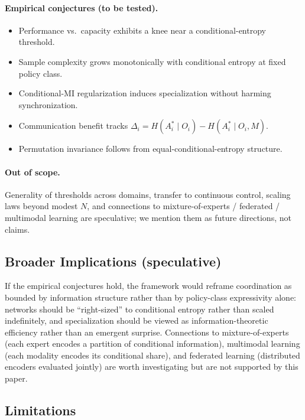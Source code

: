 \documentclass[10pt, letterpaper]{article}
\begin{document}
\paragraph{Empirical conjectures (to be tested).}
\begin{itemize}
    \item Performance vs.\ capacity exhibits a knee near a conditional-entropy threshold.
    \item Sample complexity grows monotonically with conditional entropy at fixed policy class.
    \item Conditional-MI regularization induces specialization without harming synchronization.
    \item Communication benefit tracks $\Delta_i = H(A_i^*\mid O_i) - H(A_i^*\mid O_i, M)$.
    \item Permutation invariance follows from equal-conditional-entropy structure.
\end{itemize}

\paragraph{Out of scope.} Generality of thresholds across domains, transfer to continuous control, scaling laws beyond modest $N$, and connections to mixture-of-experts / federated / multimodal learning are speculative; we mention them as future directions, not claims.

\subsection{Broader Implications (speculative)}

If the empirical conjectures hold, the framework would reframe coordination as bounded by information structure rather than by policy-class expressivity alone: networks should be ``right-sized'' to conditional entropy rather than scaled indefinitely, and specialization should be viewed as information-theoretic efficiency rather than an emergent surprise. Connections to mixture-of-experts (each expert encodes a partition of conditional information), multimodal learning (each modality encodes its conditional share), and federated learning (distributed encoders evaluated jointly) are worth investigating but are not supported by this paper.

\subsection{Limitations}
\end{document}
